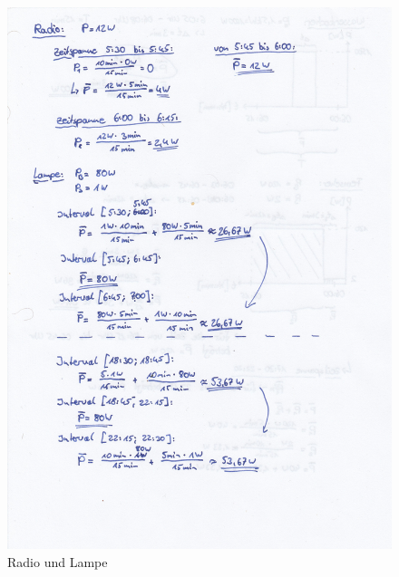 \documentclass[12pt,a4paper]{scrartcl}
\begin{document}
\begin{figure}[h]
 \centering
 \includegraphics[width=12cm]{src/bild2.jpg}
 \caption{Radio und Lampe}
 \label{Radio und Lampe}
\end{figure}

\newpage
\end{document}
